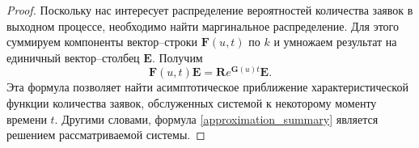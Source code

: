 \begin{proof}
	Поскольку нас интересует распределение вероятностей количества заявок в выходном процессе, необходимо найти маргинальное распределение. Для этого суммируем компоненты вектор--строки $\boldsymbol{F}(u,t)$ по $k$ и умножаем результат на единичный вектор--столбец $\boldsymbol{E}$. Получим
	\begin{equation}\label{approximation_summary}
		\boldsymbol{F}(u,t)\boldsymbol{E}=\boldsymbol{R}e^{\boldsymbol{G}(u)t}\boldsymbol{E}.
	\end{equation}
	Эта формула позволяет найти асимптотическое приближение характеристической функции количества заявок, обслуженных системой к некоторому моменту времени $t$. Другими словами, формула \eqref{approximation_summary} является решением рассматриваемой системы. 
\end{proof}


